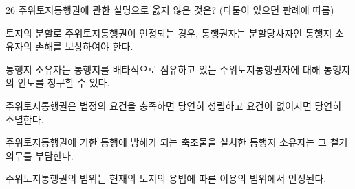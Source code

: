 \begin{question}{26}
주위토지통행권에 관한 설명으로 옳지 않은 것은? (다툼이 있으면 판례에 따름)
\begin{choices}
  \item 토지의 분할로 주위토지통행권이 인정되는 경우, 통행권자는 분할당사자인 통행지 소유자의 손해를 보상하여야 한다.
  \item 통행지 소유자는 통행지를 배타적으로 점유하고 있는 주위토지통행권자에 대해 통행지의 인도를 청구할 수 있다.
  \item 주위토지통행권은 법정의 요건을 충족하면 당연히 성립하고 요건이 없어지면 당연히 소멸한다.
  \item 주위토지통행권에 기한 통행에 방해가 되는 축조물을 설치한 통행지 소유자는 그 철거의무를 부담한다.
  \item 주위토지통행권의 범위는 현재의 토지의 용법에 따른 이용의 범위에서 인정된다.
\end{choices}
\end{question}
